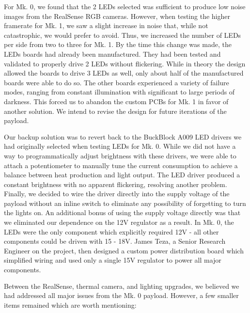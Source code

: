 For Mk. 0, we found that the 2 LEDs selected was sufficient to produce low noise images from the RealSense RGB cameras. However, when testing the higher framerate for Mk. 1, we saw a slight increase in noise that, while not catastrophic, we would prefer to avoid. Thus, we increased the number of LEDs per side from two to three for Mk. 1. By the time this change was made, the LEDs boards had already been manufactured. They had been tested and validated to properly drive 2 LEDs without flickering. While in theory the design allowed the boards to drive 3 LEDs as well, only about half of the manufactured boards were able to do so. The other boards experienced a variety of failure modes, ranging from constant illumination with significant to large periods of darkness. This forced us to abandon the custom PCBs for Mk. 1 in favor of another solution. We intend to revise the design for future iterations of the payload.

Our backup solution was to revert back to the BuckBlock A009 LED drivers we had originally selected when testing LEDs for Mk. 0. While we did not have a way to programmatically adjust brightness with these drivers, we were able to attach a potentiometer to manually tune the current consumption to achieve a balance between heat production and light output. The LED driver produced a constant brightness with no apparent flickering, resolving another problem. Finally, we decided to wire the driver directly into the supply voltage of the payload without an inline switch to eliminate any possibility of forgetting to turn the lights on. An additional bonus of using the supply voltage directly was that we eliminated our dependence on the 12V regulator as a result. In Mk. 0, the LEDs were the only component which explicitly required 12V - all other components could be driven with 15 - 18V. James Teza, a Senior Research Engineer on the project, then designed a custom power distribution board which simplified wiring and used only a single 15V regulator to power all major components.

Between the RealSense, thermal camera, and lighting upgrades, we believed we had addressed all major issues from the Mk. 0 payload. However, a few smaller items remained which are worth mentioning:

